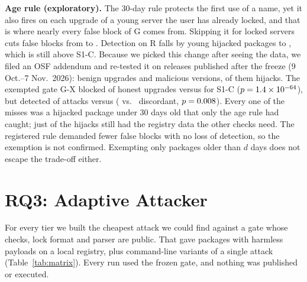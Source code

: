 \documentclass[conference]{IEEEtran}
\newcommand{\G}{\textsf{G}}
\newcommand{\SC}{\textsf{S1-C}}
\newcommand{\GX}{\textsf{G-X}}
\begin{document}
\textbf{Age rule (exploratory).} The 30-day rule protects the first use of a name, yet it also fires on each upgrade of
a young server the user has already locked, and that is where nearly every false block of \G{} comes from. Skipping it
for locked servers cuts false blocks from \FbGP{} to \AgeFbP{} \AgeFbCI. Detection on R falls by \AgeLost{} young hijacked
packages to \AgeDetP, which is still \AgeAdded{} above \SC. Because we picked this change after seeing the data, we filed
an OSF addendum and re-tested it on releases published after the freeze (9 Oct.--7 Nov.\ 2026): \AoneB{} benign upgrades
and \AoneR{} malicious versions, \AoneRC{} of them hijacks. The exempted gate \GX{} blocked \AoneFbGXP{} \AoneFbGXCI{} of
honest upgrades versus \AoneFbSCP{} for \SC{} ($p = 1.4\times10^{-64}$), but detected \AoneDetGXP{} of attacks versus
\AoneDetSCP{} (\AoneHOneGX{} vs.\ \AoneLost{} discordant, $p = 0.008$). Every one of the \AoneLost{} misses was a
hijacked package under 30 days old that only the age rule had caught; just \AoneCEval{} of the \AoneRC{} hijacks still
had the registry data the other checks need. The registered rule demanded fewer false blocks with no loss of detection,
so the exemption is not confirmed. Exempting only packages older than $d$ days does not escape the trade-off either.

\section{RQ3: Adaptive Attacker}
\label{sec:adaptive}
For every tier we built the cheapest attack we could find against a gate whose checks, lock format and parser are
public. That gave \ENCases{} packages with harmless payloads on a local registry, plus \EElevenN{} command-line
variants of a single attack (Table~\ref{tab:matrix}). Every run used the frozen gate, and nothing was published or executed.
\end{document}
